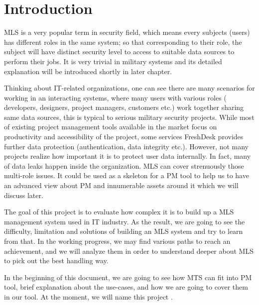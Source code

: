
\chapter{Introduction} %

\label{ch:introduction} %


MLS is a very popular term in security field, which means every subjects (\ie users) has different roles in the same system;
so that corresponding to their role, the subject will have distinct security level to access to suitable data sources to perform their jobs.
It is very trivial in military systems and its detailed explanation will be introduced shortly in later chapter.

Thinking about IT-related organizations, one can see there are many scenarios for working in an interacting systems, where many users with various roles (\eg\,developers, designers, project managers, customers etc.) work together sharing same data sources, this is typical \eg to serious military security projects.
While most of existing project management tools available in the market focus on productivity and accessibility of the project, some services \eg FreshDesk provides further data protection (authentication, data integrity etc.). However, not many projects realize how important it is to protect user data internally. In fact, many of data leaks happen inside the organization. MLS can cover strenuously those multi-role issues. It could be used as a skeleton for a PM tool to help us to have an advanced view about PM and innumerable assets around it which we will discuss later.

The goal of this project is to evaluate how complex it is to build up a MLS management system used in IT industry.
As the result, we are going to see the difficulty, limitation and solutions of building an MLS system and try to learn from that.
In the working progress, we may find various paths to reach an achievement, and we will analyze them in order to understand deeper about MLS to pick out the best handling way.

In the beginning of this document, we are going to see how MTS can fit into PM tool, brief explanation about the use-cases, and how we are going to cover them in our tool.
At the moment, we will name this project \myProject.

